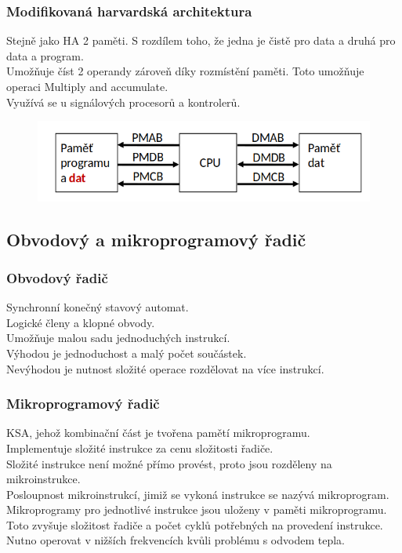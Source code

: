 \subsubsection*{Modifikovaná harvardská architektura}
Stejně jako HA 2 paměti. S rozdílem toho, že jedna je čistě pro data a druhá pro data a program.\\
Umožňuje číst 2 operandy zároveň díky rozmístění paměti. Toto umožňuje operaci Multiply and accumulate. \\
Využívá se u signálových procesorů a kontrolerů. \\

\begin{figure}[h!]
    \centering
    \includegraphics[width = \textwidth]{img/MHAporovnani.png}
\end{figure}

\subsection{Obvodový a mikroprogramový řadič}
\subsubsection*{Obvodový řadič}
Synchronní konečný stavový automat.\\
Logické členy a klopné obvody. \\
Umožňuje malou sadu jednoduchých instrukcí. \\
Výhodou je jednoduchost a malý počet součástek. \\
Nevýhodou je nutnost složité operace rozdělovat na více instrukcí. \\

\subsubsection*{Mikroprogramový řadič}
KSA, jehož kombinační část je tvořena pamětí mikroprogramu. \\
Implementuje složité instrukce za cenu složitosti řadiče. \\
Složité instrukce není možné přímo provést, proto jsou rozděleny na mikroinstrukce. \\
Posloupnost mikroinstrukcí, jimiž se vykoná instrukce se nazývá mikroprogram. \\
Mikroprogramy pro jednotlivé instrukce jsou uloženy v paměti mikroprogramu. \\
Toto zvyšuje složitost řadiče a počet cyklů potřebných na provedení instrukce. \\
Nutno operovat v nižších frekvencích kvůli problému s odvodem tepla. \\

